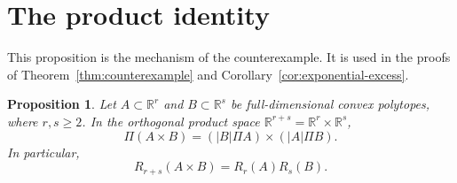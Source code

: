 \documentclass[11pt]{article}
\newtheorem{proposition}[theorem]{Proposition}
\newcommand{\R}{\mathbb R}
\begin{document}
\section{The product identity}\label{sec:product}

This proposition is the mechanism of the counterexample. It is used in
the proofs of Theorem~\ref{thm:counterexample} and
Corollary~\ref{cor:exponential-excess}.

\begin{proposition}\label{prop:product}
Let \(A\subset\R^r\) and \(B\subset\R^s\) be full-dimensional convex
polytopes, where \(r,s\ge2\). In the orthogonal product space
\(\R^{r+s}=\R^r\times\R^s\),
\begin{equation}\label{eq:product-body}
 \Pi(A\times B)=(|B|\Pi A)\times(|A|\Pi B).
\end{equation}
In particular,
\begin{equation}\label{eq:multiplicative}
 R_{r+s}(A\times B)=R_r(A)R_s(B).
\end{equation}
\end{proposition}
\end{document}
